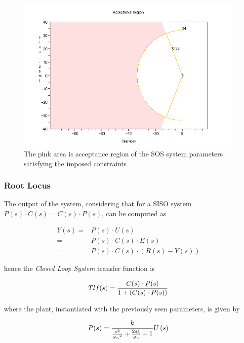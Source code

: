 \begin{figure}[htbp]
  \begin{center}
  \includegraphics[scale=0.5]{FIGURES_2/AcceptanceRegion.png}
    \caption[Acceptance Region]{The pink area is acceptance region of the SOS system parameters satisfying the imposed constraints}
    \label{fig:AcceptanceRegion}
  \end{center}
\end{figure}

\subsubsection{Root Locus}

The output of the system, considering that for a SISO system $P(s)\cdot{}C(s) = C(s)\cdot{}P(s)$, can be computed as

\begin{equation}
\begin{split}
 Y(s) =& P(s)\cdot{}U(s)\\
 =& P(s)\cdot{}C(s)\cdot{}E(s)\\
 =& P(s)\cdot{}C(s)\cdot{}(R(s)-Y(s))
\end{split}
\end{equation}

hence the \emph{Closed Loop System} transfer function is

\[
Tlf(s) = {{C(s) \cdot P(s)} \over {1 + {( C(s) \cdot P(s) )}}}
\]

where the plant, instantiated with the previously seen parameters, is given by

\[
	P(s) = {{k \over {{s^2 \over {{\omega_n}^2}} + {2s{\xi} \over
        			{\omega_n}} + 1}}U\left (s\right )}
\]


